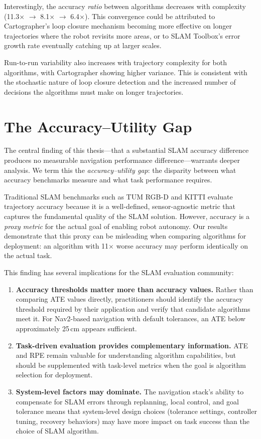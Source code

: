 Interestingly, the accuracy \emph{ratio} between algorithms decreases with complexity (11.3$\times$ $\rightarrow$ 8.1$\times$ $\rightarrow$ 6.4$\times$). This convergence could be attributed to Cartographer's loop closure mechanism becoming more effective on longer trajectories where the robot revisits more areas, or to SLAM Toolbox's error growth rate eventually catching up at larger scales.

Run-to-run variability also increases with trajectory complexity for both algorithms, with Cartographer showing higher variance. This is consistent with the stochastic nature of loop closure detection and the increased number of decisions the algorithms must make on longer trajectories.

\section{The Accuracy--Utility Gap}

The central finding of this thesis---that a substantial SLAM accuracy difference produces no measurable navigation performance difference---warrants deeper analysis. We term this the \emph{accuracy--utility gap}: the disparity between what accuracy benchmarks measure and what task performance requires.

Traditional SLAM benchmarks such as TUM RGB-D \citep{sturm2012benchmark} and KITTI \citep{geiger2013kitti} evaluate trajectory accuracy because it is a well-defined, sensor-agnostic metric that captures the fundamental quality of the SLAM solution. However, accuracy is a \emph{proxy metric} for the actual goal of enabling robot autonomy. Our results demonstrate that this proxy can be misleading when comparing algorithms for deployment: an algorithm with 11$\times$ worse accuracy may perform identically on the actual task.

This finding has several implications for the SLAM evaluation community:

\begin{enumerate}
\item \textbf{Accuracy thresholds matter more than accuracy values.} Rather than comparing ATE values directly, practitioners should identify the accuracy threshold required by their application and verify that candidate algorithms meet it. For Nav2-based navigation with default tolerances, an ATE below approximately 25\,cm appears sufficient.

\item \textbf{Task-driven evaluation provides complementary information.} ATE and RPE remain valuable for understanding algorithm capabilities, but should be supplemented with task-level metrics when the goal is algorithm selection for deployment.

\item \textbf{System-level factors may dominate.} The navigation stack's ability to compensate for SLAM errors through replanning, local control, and goal tolerance means that system-level design choices (tolerance settings, controller tuning, recovery behaviors) may have more impact on task success than the choice of SLAM algorithm.
\end{enumerate}

